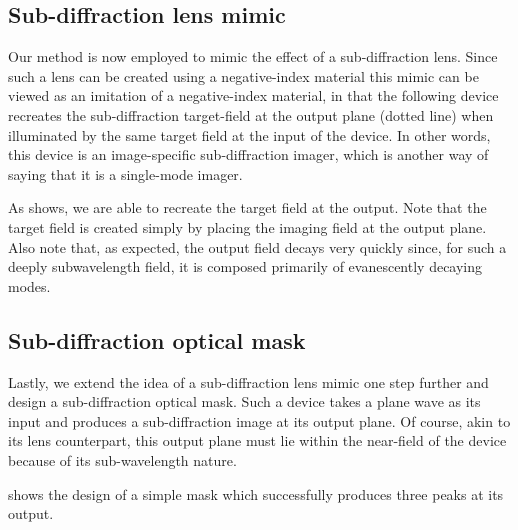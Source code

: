 \subsection{Sub-diffraction lens mimic}
Our method is now employed to mimic the effect of a sub-diffraction lens.
Since such a lens can be created using a negative-index material
    this mimic can be viewed as an imitation of a negative-index material,
    in that the following device recreates the sub-diffraction target-field 
    at the output plane (dotted line)
    when illuminated by the same target field at the input of the device.
In other words,
    this device is an image-specific sub-diffraction imager,
    which is another way of saying that it is a single-mode imager.

As  shows,
   we are able to recreate the target field at the output.
Note that the target field is created simply by placing 
    the imaging field at the output plane.
Also note that, as expected, 
    the output field decays very quickly since,
    for such a deeply subwavelength field,
    it is composed primarily of evanescently decaying modes.

\subsection{Sub-diffraction optical mask}
Lastly, we extend the idea of a sub-diffraction lens mimic
    one step further and
    design a sub-diffraction optical mask.
Such a device takes a plane wave as its input and
    produces a sub-diffraction image at its output plane.
Of course, akin to its lens counterpart,
    this output plane must lie within the near-field of the device
    because of its sub-wavelength nature.

 shows the design of a simple mask which 
    successfully produces three peaks at its output.

